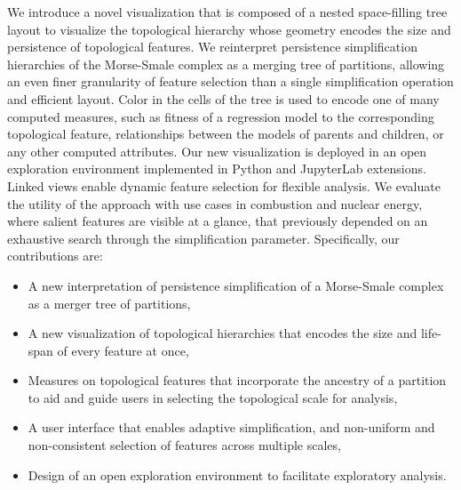 We introduce a novel visualization that is composed of a nested space-filling tree layout to visualize the topological hierarchy whose geometry encodes the size and persistence of topological features. We reinterpret persistence simplification hierarchies of the Morse-Smale complex as a merging tree of partitions, allowing an even finer granularity of feature selection than a single simplification operation and efficient layout. Color in the cells of the tree is used to encode one of many computed measures, such as fitness of a regression model to the corresponding topological feature, relationships between the models of parents and children, or any other computed attributes. Our new visualization is deployed in an open exploration environment implemented in Python and JupyterLab extensions. Linked views enable dynamic feature selection for flexible analysis. We evaluate the utility of the approach with use cases in combustion and nuclear energy, where salient features are visible at a glance, that previously depended on an exhaustive search through the simplification parameter.
Specifically, our contributions are:
\begin{itemize}[nosep]
    \item A new interpretation of persistence simplification of a Morse-Smale complex as a merger tree of partitions,

    \item A new visualization of topological hierarchies that encodes the size and life-span of every feature at once,

    \item Measures on topological features that incorporate the ancestry of a partition to aid and guide users in selecting the topological scale for analysis, 

    \item A user interface that enables adaptive simplification, and non-uniform and non-consistent selection of features across multiple scales, 
    
    \item Design of an open exploration environment to facilitate exploratory analysis. 
\end{itemize}


    
